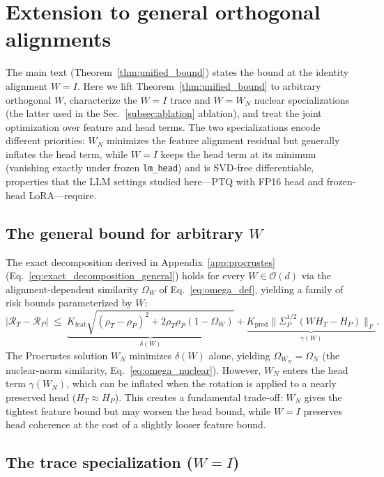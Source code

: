 
\section{Extension to general orthogonal alignments}
\label{app:general_W}

The main text (Theorem~\ref{thm:unified_bound}) states the bound at the identity alignment $W = I$. Here we lift Theorem~\ref{thm:unified_bound} to arbitrary orthogonal $W$, characterize the $W = I$ trace and $W = W_N$ nuclear specializations (the latter used in the Sec.~\ref{subsec:ablation} ablation), and treat the joint optimization over feature and head terms. The two specializations encode different priorities: $W_N$ minimizes the feature alignment residual but generally inflates the head term, while $W = I$ keeps the head term at its minimum (vanishing exactly under frozen \texttt{lm\_head}) and is SVD-free differentiable, properties that the LLM settings studied here---PTQ with FP16 head and frozen-head LoRA---require.

\subsection{The general bound for arbitrary $W$}
\label{app:general_bound}

The exact decomposition derived in Appendix~\ref{app:procrustes} (Eq.~\ref{eq:exact_decomposition_general}) holds for every $W \in \mathcal{O}(d)$ via the alignment-dependent similarity $\Omega_W$ of Eq.~\ref{eq:omega_def}, yielding a family of risk bounds parameterized by $W$:
\begin{equation}
|\mathcal{R}_T - \mathcal{R}_P| \;\le\; \underbrace{K_{\mathrm{feat}} \sqrt{(\rho_T - \rho_P)^2 + 2\rho_T\rho_P(1 - \Omega_W)}}_{\delta(W)} + \underbrace{K_{\mathrm{pred}} \|\Sigma_P^{1/2}(W H_T - H_P)\|_F}_{\gamma(W)}.
\end{equation}
The Procrustes solution $W_N$ minimizes $\delta(W)$ alone, yielding $\Omega_{W_N} = \Omega_N$ (the nuclear-norm similarity, Eq.~\ref{eq:omega_nuclear}). However, $W_N$ enters the head term $\gamma(W_N)$, which can be inflated when the rotation is applied to a nearly preserved head ($H_T \approx H_P$). This creates a fundamental trade-off: $W_N$ gives the tightest feature bound but may worsen the head bound, while $W = I$ preserves head coherence at the cost of a slightly looser feature bound.

\subsection{The trace specialization ($W = I$)}
\label{app:trace_specialization}

